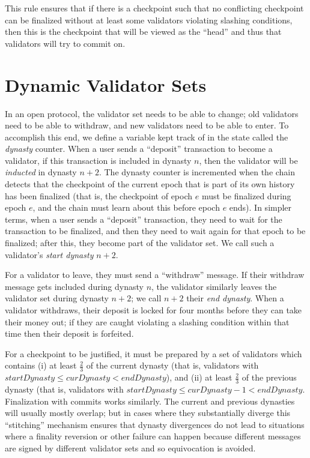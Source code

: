 \documentclass[12pt]{article}
\begin{document}
This rule ensures that if there is a checkpoint such that no conflicting checkpoint can be finalized without at least some validators violating slashing conditions, then this is the checkpoint that will be viewed as the ``head'' and thus that validators will try to commit on.

\section{Dynamic Validator Sets}

In an open protocol, the validator set needs to be able to change; old validators need to be able to withdraw, and new validators need to be able to enter. To accomplish this end, we define a variable kept track of in the state called the \textit{dynasty} counter. When a user sends a ``deposit'' transaction to become a validator, if this transaction is included in dynasty $n$, then the validator will be \textit{inducted} in dynasty $n+2$. The dynasty counter is incremented when the chain detects that the checkpoint of the current epoch that is part of its own history has been finalized (that is, the checkpoint of epoch $e$ must be finalized during epoch $e$, and the chain must learn about this before epoch $e$ ends). In simpler terms, when a user sends a ``deposit'' transaction, they need to wait for the transaction to be finalized, and then they need to wait again for that epoch to be finalized; after this, they become part of the validator set. We call such a validator's \textit{start dynasty} $n+2$.

For a validator to leave, they must send a ``withdraw'' message. If their withdraw message gets included during dynasty $n$, the validator similarly leaves the validator set during dynasty $n+2$; we call $n+2$ their \textit{end dynasty}. When a validator withdraws, their deposit is locked for four months before they can take their money out; if they are caught violating a slashing condition within that time then their deposit is forfeited.

For a checkpoint to be justified, it must be prepared by a set of validators which contains (i) at least $\frac{2}{3}$ of the current dynasty (that is, validators with $startDynasty \le curDynasty < endDynasty$), and (ii) at least $\frac{2}{3}$ of the previous dynasty (that is, validators with $startDynasty \le curDynasty - 1 < endDynasty$. Finalization with commits works similarly. The current and previous dynasties will usually mostly overlap; but in cases where they substantially diverge this ``stitching'' mechanism ensures that dynasty divergences do not lead to situations where a finality reversion or other failure can happen because different messages are signed by different validator sets and so equivocation is avoided.
\end{document}

